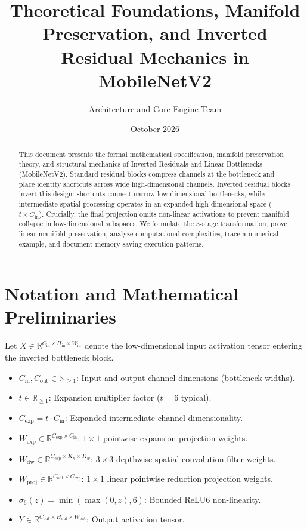 \documentclass[11pt,a4paper]{article}
\title{\textbf{Theoretical Foundations, Manifold Preservation, and Inverted Residual Mechanics in MobileNetV2}}
\author{Architecture and Core Engine Team}
\date{October 2026}
\theoremstyle{definition}
\begin{document}
\maketitle

\begin{abstract}
This document presents the formal mathematical specification, manifold preservation theory, and structural mechanics of Inverted Residuals and Linear Bottlenecks (MobileNetV2). Standard residual blocks compress channels at the bottleneck and place identity shortcuts across wide high-dimensional channels. Inverted residual blocks invert this design: shortcuts connect narrow low-dimensional bottlenecks, while intermediate spatial processing operates in an expanded high-dimensional space ($t \times C_{\text{in}}$). Crucially, the final projection omits non-linear activations to prevent manifold collapse in low-dimensional subspaces. We formulate the 3-stage transformation, prove linear manifold preservation, analyze computational complexities, trace a numerical example, and document memory-saving execution patterns.
\end{abstract}

\section{Notation and Mathematical Preliminaries}

Let $X \in \mathbb{R}^{C_{\text{in}} \times H_{\text{in}} \times W_{\text{in}}}$ denote the low-dimensional input activation tensor entering the inverted bottleneck block.

\begin{itemize}
    \item $C_{\text{in}}, C_{\text{out}} \in \mathbb{N}_{\ge 1}$: Input and output channel dimensions (bottleneck widths).
    \item $t \in \mathbb{R}_{\ge 1}$: Expansion multiplier factor ($t = 6$ typical).
    \item $C_{\text{exp}} = t \cdot C_{\text{in}}$: Expanded intermediate channel dimensionality.
    \item $W_{\text{exp}} \in \mathbb{R}^{C_{\text{exp}} \times C_{\text{in}}}$: $1 \times 1$ pointwise expansion projection weights.
    \item $W_{\text{dw}} \in \mathbb{R}^{C_{\text{exp}} \times K_h \times K_w}$: $3 \times 3$ depthwise spatial convolution filter weights.
    \item $W_{\text{proj}} \in \mathbb{R}^{C_{\text{out}} \times C_{\text{exp}}}$: $1 \times 1$ linear pointwise reduction projection weights.
    \item $\sigma_6(z) = \min(\max(0, z), 6)$: Bounded ReLU6 non-linearity.
    \item $Y \in \mathbb{R}^{C_{\text{out}} \times H_{\text{out}} \times W_{\text{out}}}$: Output activation tensor.
\end{itemize}
\end{document}
